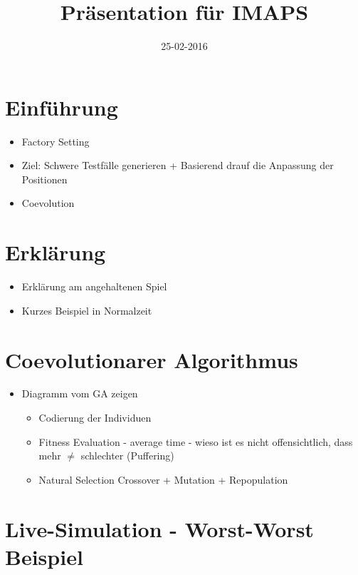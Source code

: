 \documentclass{article}
\title{Präsentation für IMAPS}
\date{25-02-2016}
\begin{document}
\maketitle

\section*{Einführung}

\begin{itemize}
  \item Factory Setting
  \item Ziel: Schwere Testfälle generieren + Basierend drauf die Anpassung der Positionen
  \item Coevolution
\end{itemize}


\section*{Erklärung}

\begin{itemize}
  \item Erklärung am angehaltenen Spiel
  \item Kurzes Beispiel in Normalzeit
\end{itemize}

\section*{Coevolutionarer Algorithmus}

\begin{itemize}
  \item Diagramm vom GA zeigen
    \begin{itemize}
      \item Codierung der Individuen
      \item Fitness Evaluation - average time - wieso ist es nicht offensichtlich, dass mehr $\not=$ schlechter (Puffering)
      \item Natural Selection Crossover + Mutation + Repopulation 
    \end{itemize}
\end{itemize}

\section*{Live-Simulation - Worst-Worst Beispiel}
\end{document}
